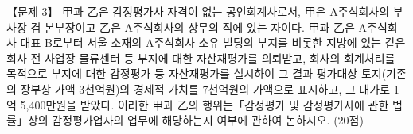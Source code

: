 \begin{longquestion}{【문제 3】}
甲과 乙은 감정평가사 자격이 없는 공인회계사로서, 甲은 A주식회사의 부사장 겸 본부장이고 乙은 A주식회사의 상무의 직에 있는 자이다. 甲과 乙은 A주식회사 대표 B로부터 서울 소재의 A주식회사 소유 빌딩의 부지를 비롯한 지방에 있는 같은 회사 전 사업장 물류센터 등 부지에 대한 자산재평가를 의뢰받고, 회사의 회계처리를 목적으로 부지에 대한 감정평가 등 자산재평가를 실시하여 그 결과 평가대상 토지(기존의 장부상 가액 3천억원)의 경제적 가치를 7천억원의 가액으로 표시하고, 그 대가로 1억 5,400만원을 받았다. 이러한 甲과 乙의 행위는「감정평가 및 감정평가사에 관한 법률」상의 감정평가업자의 업무에 해당하는지 여부에 관하여 논하시오. (20점) \par
\end{longquestion}
